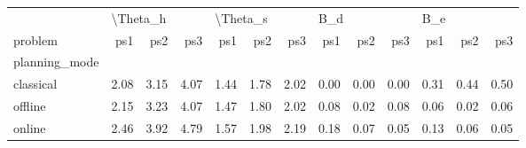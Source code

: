 \begin{tabular}{lrrrrrrrrrrrr}
\toprule
{} & \multicolumn{3}{l}{\textbackslash Theta\_h} & \multicolumn{3}{l}{\textbackslash Theta\_s} & \multicolumn{3}{l}{B\_d} & \multicolumn{3}{l}{B\_e} \\
problem &      ps1 &  ps2 &  ps3 &      ps1 &  ps2 &  ps3 &  ps1 &  ps2 &  ps3 &  ps1 &  ps2 &  ps3 \\
planning\_mode &          &      &      &          &      &      &      &      &      &      &      &      \\
\midrule
classical     &     2.08 & 3.15 & 4.07 &     1.44 & 1.78 & 2.02 & 0.00 & 0.00 & 0.00 & 0.31 & 0.44 & 0.50 \\
offline       &     2.15 & 3.23 & 4.07 &     1.47 & 1.80 & 2.02 & 0.08 & 0.02 & 0.08 & 0.06 & 0.02 & 0.06 \\
online        &     2.46 & 3.92 & 4.79 &     1.57 & 1.98 & 2.19 & 0.18 & 0.07 & 0.05 & 0.13 & 0.06 & 0.05 \\
\bottomrule
\end{tabular}
